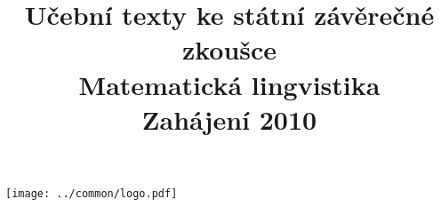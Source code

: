 \clearpage

\clearpage

\title{\LARGE Učební texty ke státní závěrečné zkoušce \\ Matematická lingvistika \\ Zahájení 2010}




\maketitle

\vspace{10mm}
\begin{center}
\texttt{[image: ../common/logo.pdf]}
\end{center} 

\clearpage

\clearpage

\tableofcontents








